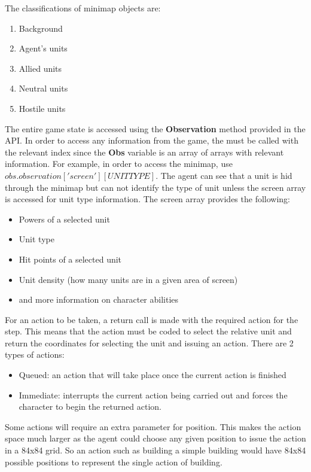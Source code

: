 The classifications of minimap objects are:
\begin{enumerate}
\item Background
\item Agent's units
\item Allied units
\item Neutral units
\item Hostile units
\end{enumerate}

The entire game state is accessed using the \textbf{Observation} method provided in the API. In order to access any information from the game, the must be called with the relevant index since the \textbf{Obs} variable is an array of arrays with relevant information. For example, in order to access the minimap, use $obs.observation['screen'][UNITTYPE]$. The agent can see that a unit is hid through the minimap but can not identify the type of unit unless the screen array is accessed for unit type information. The screen array provides the following:
\begin{itemize}
\item Powers of a selected unit
\item Unit type
\item Hit points of a selected unit
\item Unit density (how many units are in a given area of screen)
\item and more information on character abilities
\end{itemize}
For an action to be taken, a return call is made with the required action for the step. This means that the action must be coded to select the relative unit and return the coordinates for selecting the unit and issuing an action. There are 2 types of actions:
\begin{itemize}
\item Queued: an action that will take place once the current action is finished
\item Immediate: interrupts the current action being carried out and forces the character to begin the returned action.
\end{itemize}
Some actions will require an extra parameter for position. This makes the action space much larger as the agent could choose any given position to issue the action in a 84x84 grid. So an action such as building a simple building would have 84x84 possible positions to represent the single action of building.

